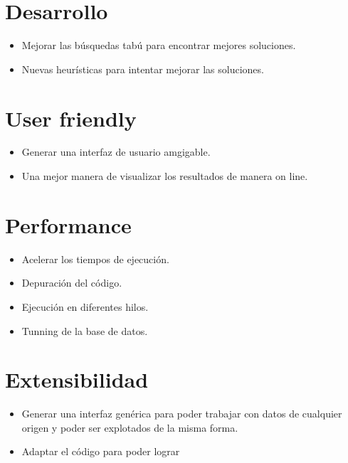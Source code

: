 \section{Desarrollo}
\begin{itemize}
 \item Mejorar las búsquedas tabú para encontrar mejores soluciones.
 \item Nuevas heurísticas para intentar mejorar las soluciones.
\end{itemize}


\section{User friendly}
\begin{itemize}
 \item Generar una interfaz de usuario amgigable.
 \item Una mejor manera de visualizar los resultados de manera on line.
\end{itemize}

\section{Performance}
\begin{itemize}
 \item Acelerar los tiempos de ejecución.
 \item Depuración del código.
 \item Ejecución en diferentes hilos.
 \item Tunning de la base de datos.
\end{itemize}

\section{Extensibilidad}
\begin{itemize}
 \item Generar una interfaz genérica para poder trabajar con datos de cualquier origen y poder ser explotados de la misma forma.
 \item Adaptar el código para poder lograr 
\end{itemize}
